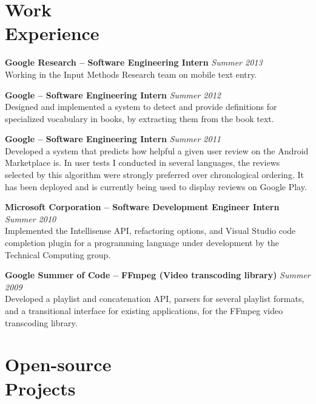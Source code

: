 \documentclass[margin,line]{resume}
\begin{document}
\begin{resume}

\section{\mysidestyle Work\\Experience}

\textbf{Google Research -- Software Engineering Intern} \hfill \textsl{Summer 2013}\\
Working in the Input Methods Research team on mobile text entry.

\textbf{Google -- Software Engineering Intern} \hfill \textsl{Summer 2012}\\
Designed and implemented a system to detect and provide definitions for specialized vocabulary in books, by extracting them from the book text.

\textbf{Google -- Software Engineering Intern} \hfill \textsl{Summer 2011}\\
Developed a system that predicts how helpful a given user review on the Android Marketplace is.
In user tests I conducted in several languages, the reviews selected by this algorithm
were strongly preferred over chronological ordering. It has been deployed and is currently being used to display reviews on Google Play.

\textbf{Microsoft Corporation -- Software Development Engineer Intern} \hfill \textsl{Summer 2010}\\
Implemented the Intellisense API, refactoring options, and Visual Studio code completion plugin for a programming language under development by the Technical Computing group.

\textbf{Google Summer of Code -- FFmpeg (Video transcoding library)} \hfill \textsl{Summer 2009}\\
Developed a playlist and concatenation API, parsers for several playlist formats, and a transitional interface for existing applications, for the FFmpeg video transcoding library.

\section{\mysidestyle Open-source\\Projects}


\end{resume}
\end{document}
